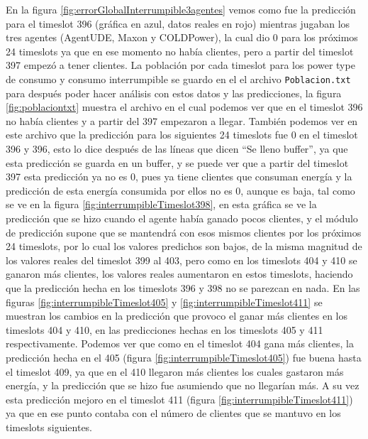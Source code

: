 En la figura \ref{fig:errorGlobalInterrumpible3agentes} vemos como fue la predicción para el timeslot 396 (gráfica en azul, datos reales en rojo) mientras jugaban los tres agentes (AgentUDE, Maxon y COLDPower), la cual dio 0 para los próximos 24 timeslots ya que en ese momento no había clientes, pero a partir del timeslot 397 empezó a tener clientes. 
La población por cada timeslot para los power type de consumo y consumo interrumpible se guardo en el el archivo \texttt{Poblacion.txt} para después poder hacer análisis con estos datos y las predicciones, la figura \ref{fig:poblaciontxt} muestra el archivo en el cual podemos ver que en el timeslot 396 no había clientes y a partir del 397 empezaron a llegar.
También podemos ver en este archivo que la predicción para los siguientes 24 timeslots fue 0 en el timeslot 396 y 396, esto lo dice después de las líneas que dicen ``Se lleno buffer'', ya que esta predicción se guarda en un buffer, y se puede ver que a partir del timeslot 397 esta predicción ya no es 0, pues ya tiene clientes que consuman energía y la predicción de esta energía consumida por ellos no es 0, aunque es baja, tal como se ve en la figura \ref{fig:interrumpibleTimeslot398}, en esta gráfica se ve la predicción que se hizo cuando el agente había ganado pocos clientes, y el módulo de predicción supone que se mantendrá con esos mismos clientes por los próximos 24 timeslots, por lo cual los valores predichos son bajos, de la misma magnitud de los valores reales del timeslot 399 al 403, pero como en los timeslots 404 y 410 se ganaron más clientes, los valores reales aumentaron en estos timeslots, haciendo que la predicción hecha en los timeslots 396 y 398 no se parezcan en nada.
En las figuras \ref{fig:interrumpibleTimeslot405} y \ref{fig:interrumpibleTimeslot411} se muestran los cambios en la predicción que provoco el ganar más clientes en los timeslots 404 y 410, en las predicciones hechas en los timeslots 405 y 411 respectivamente. 
Podemos ver que como en el timeslot 404 gana más clientes, la predicción hecha en el 405 (figura \ref{fig:interrumpibleTimeslot405}) fue buena hasta el timeslot 409, ya que en el 410 llegaron más clientes los cuales gastaron más energía, y la predicción que se hizo fue asumiendo que no llegarían más. 
A su vez esta predicción mejoro en el timeslot 411 (figura \ref{fig:interrumpibleTimeslot411}) ya que en ese punto contaba con el número de clientes que se mantuvo en los timeslots siguientes.

